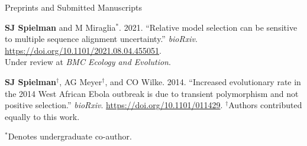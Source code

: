 \documentclass{resume} %
\begin{document}
\vspace*{0.35cm}
\begin{rSection}{Preprints and Submitted Manuscripts}
\vspace*{0.25cm}

\begin{etaremune}[leftmargin=1.5em]

\item \textbf{SJ Spielman} and M Miraglia$^\ast$. 2021. ``Relative model selection can be sensitive to multiple sequence alignment uncertainty.'' \emph{bioRxiv}. \url{https://doi.org/10.1101/2021.08.04.455051}. \\
Under review at \emph{BMC Ecology and Evolution}.


\item \textbf{SJ Spielman}$^\dagger$, AG Meyer$^\dagger$, and CO Wilke. 2014. ``Increased evolutionary rate in the 2014 West African Ebola outbreak is due to transient polymorphism and not positive selection.'' \emph{bioRxiv}. \url{https://doi.org/10.1101/011429}. $^\dagger$Authors contributed equally to this work.

\end{etaremune}


$^\ast$Denotes undergraduate co-author.

\end{rSection}



\end{document}
